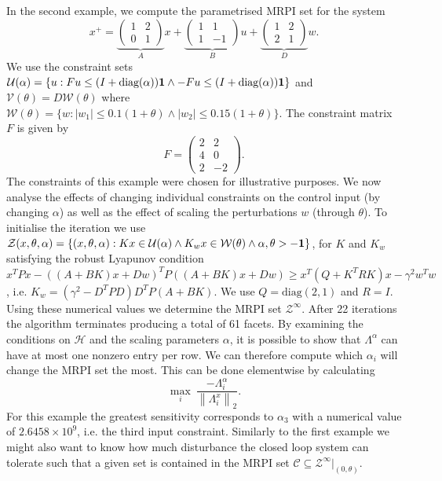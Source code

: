 \documentclass[letterpaper, 10pt, conference]{ieeeconf} %
\providecommand{\norm}[1]{\left\|#1\right\|}
\providecommand{\abs}[1]{\left|#1\right|}
\begin{document}
In the second example, we compute the parametrised MRPI set for the system
%
$$
x^+ = \underbrace{\left(\begin{array}{cc}1 & 2 \\ 0 & 1\end{array}\right)}_Ax + 
\underbrace{\left(\begin{array}{cc} 1 & 1 \\ 1 & -1\end{array}\right)}_B u + 
\underbrace{\left(\begin{array}{cc} 1 & 2 \\ 2 & 1 \end{array}\right)}_D w.
$$
%
We use the constraint sets $\mathcal U(\alpha) = \{u: Fu\leq(I+\text{diag}(\alpha)){\bf{1}} \wedge
-Fu\leq (I+\text{diag}(\alpha)){\bf{1}}\}$ and $\mathcal V(\theta) = D\mathcal W(\theta)$ where $\mathcal W(\theta) = \{w:
\abs{w_1}\leq 0.1(1+\theta)\wedge \abs{w_2}\leq 0.15(1+\theta)\}$. The constraint matrix $F$ is given by
%
$$
	F = \left(\begin{array}{cc} 2 & 2 \\ 4 & 0 \\ 2 & -2 \end{array}\right).
$$
%
The constraints of this example were chosen for  illustrative purposes.
We now analyse the effects of changing individual constraints on the control input (by changing $\alpha$) as well as the
effect of scaling the perturbations $w$ (through $\theta$). To initialise the iteration we use
$\mathcal Z(x,\theta,\alpha) = \left\{(x,\theta,\alpha): Kx\in\mathcal U(\alpha)\wedge K_w x\in\mathcal W
(\theta)\wedge \alpha,\theta>-{\bf{1}}\right\}$, for $K$ and $K_w$ satisfying the robust Lyapunov condition
$x^TPx - ((A+BK)x+Dw)^TP((A+BK)x+Dw)\geq x^T(Q+K^TRK)x -\gamma^2 w^Tw$, i.e. $K_w = (\gamma^2-D^TPD)D^TP(A+BK)$.
We use $Q = \text{diag}(2,1)$ and $R = I$. Using these numerical values we determine the MRPI set 
$\mathcal Z^\infty$. After 22 iterations the algorithm terminates producing a total of 61 facets. 
By examining the conditions on $\mathcal H$ and the scaling parameters $\alpha$, it is possible to show that 
$\Lambda^\alpha$ can have at 
most one nonzero entry per row. We can therefore 
compute which $\alpha_i$ will change the MRPI set the most. This can be done elementwise by calculating
$$
	\max_i \  \frac{-\Lambda_i^\alpha}{\norm{\Lambda_i^x}_2}.
$$
For this example the greatest sensitivity corresponds to $\alpha_3$ with a numerical value of $2.6458\times 10^9$, 
i.e. the third input constraint.
Similarly to the first example we might also want to know how much disturbance the closed loop system can tolerate such that a given set is contained in the MRPI set $\mathcal C\subseteq\mathcal Z^\infty\vert_{(0,\theta)}$.
\end{document}
